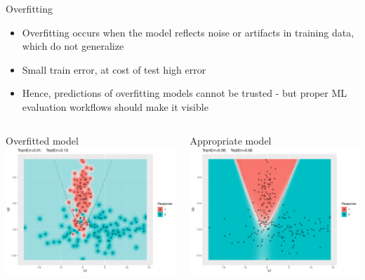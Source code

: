 \documentclass[11pt,compress,t,notes=noshow, xcolor=table]{beamer}
\begin{document}
\begin{vbframe}{Overfitting}

\begin{itemize}
  \item Overfitting occurs when the model reflects noise or artifacts in training data,
      which do not generalize
  \item Small train error, at cost of test high error
  \item Hence, predictions of overfitting models cannot be trusted -
      but proper ML evaluation workflows should make it visible
\end{itemize}
\lz
\begin{columns}
\begin{column}{0.5\textwidth}
  \raggedright
  Overfitted model\\
  \includegraphics[width=\textwidth]{figure/eval_ofit_1o}
\end{column}
\begin{column}{0.5\textwidth}
  \raggedright
    Appropriate model\\
  \includegraphics[width=\textwidth]{figure/eval_ofit_1a}
\end{column}
\end{columns}
\end{vbframe}
\end{document}
